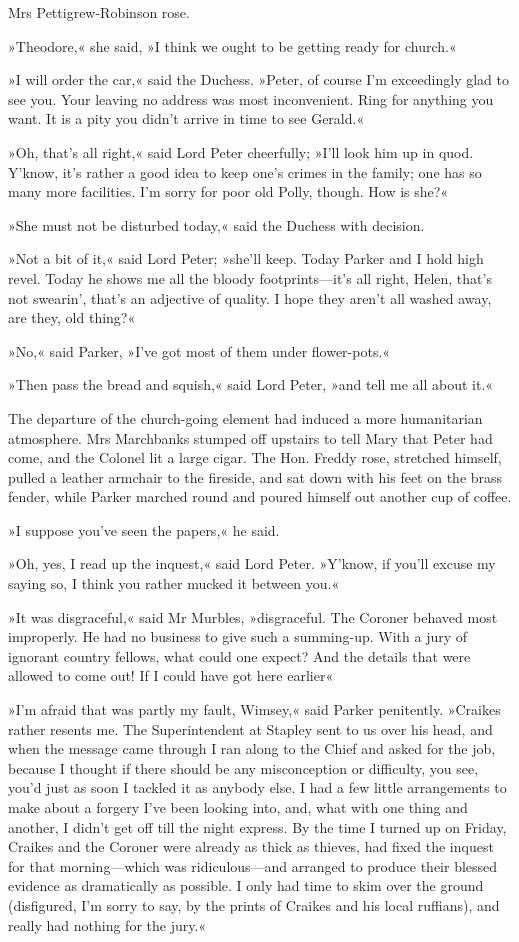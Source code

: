 Mrs Pettigrew-Robinson rose.

»Theodore,« she said, »I think we ought to be getting ready for church.«

»I will order the car,« said the Duchess. »Peter, of course I'm exceedingly glad to see you. Your leaving no address was most inconvenient. Ring for anything you want. It is a pity you didn't arrive in time to see Gerald.«

»Oh, that's all right,« said Lord Peter cheerfully; »I'll look him up in quod. Y'know, it's rather a good idea to keep one's crimes in the family; one has so many more facilities. I'm sorry for poor old Polly, though. How is she?«

»She must not be disturbed today,« said the Duchess with decision.

»Not a bit of it,« said Lord Peter; »she'll keep. Today Parker and I hold high revel. Today he shows me all the bloody footprints—it's all right, Helen, that's not swearin', that's an adjective of quality. I hope they aren't all washed away, are they, old thing?«

»No,« said Parker, »I've got most of them under flower-pots.«

»Then pass the bread and squish,« said Lord Peter, »and tell me all about it.«

The departure of the church-going element had induced a more humanitarian atmosphere. Mrs Marchbanks stumped off upstairs to tell Mary that Peter had come, and the Colonel lit a large cigar. The Hon.  Freddy rose, stretched himself, pulled a leather armchair to the fireside, and sat down with his feet on the brass fender, while Parker marched round and poured himself out another cup of coffee.

»I suppose you've seen the papers,« he said.

»Oh, yes, I read up the inquest,« said Lord Peter. »Y'know, if you'll excuse my saying so, I think you rather mucked it between you.«

»It was disgraceful,« said Mr Murbles, »disgraceful. The Coroner behaved most improperly. He had no business to give such a summing-up.  With a jury of ignorant country fellows, what could one expect? And the details that were allowed to come out! If I could have got here earlier\longdash«

»I'm afraid that was partly my fault, Wimsey,« said Parker penitently. »Craikes rather resents me. The Superintendent at Stapley sent to us over his head, and when the message came through I ran along to the Chief and asked for the job, because I thought if there should be any misconception or difficulty, you see, you'd just as soon I tackled it as anybody else. I had a few little arrangements to make about a forgery I've been looking into, and, what with one thing and another, I didn't get off till the night express. By the time I turned up on Friday, Craikes and the Coroner were already as thick as thieves, had fixed the inquest for that morning—which was ridiculous—and arranged to produce their blessed evidence as dramatically as possible. I only had time to skim over the ground (disfigured, I'm sorry to say, by the prints of Craikes and his local ruffians), and really had nothing for the jury.«

